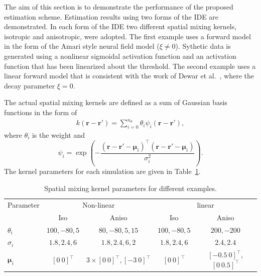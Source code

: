 \documentclass[10pt,twocolumn,twoside]{IEEEtran}
\begin{document}
The aim of this section is to demonstrate the performance of the proposed estimation scheme. Estimation results using two forms of the IDE are demonstrated. In each form of the IDE two different spatial mixing kernels, isotropic and anisotropic, were adopted. The first example uses a forward model in the form of the Amari style neural field model \cite{Amari1977} ($\xi\neq 0$). Sythetic data is generated using a nonlinear sigmoidal activation function and an activation function that has been linearized about the threshold. The second example uses a linear forward model that is consistent with the work of Dewar et al.~\cite{Dewar2007}, where the decay parameter $\xi=0$.

The actual spatial mixing kernels are defined as a sum of Gaussian basis functions in the form of
\begin{align}\label{eq:sumofGaussians}
 k\left(\mathbf{r}-\mathbf{r}'\right)=\sum_{i=0}^{n_{\theta}}\theta_i\psi_i\left(\mathbf{r}-\mathbf{r}'\right), 
 \end{align}
where $\theta_i$ is the weight and
\begin{equation}\label{eq:Kernelbasis}
	\psi_i=\exp{\left(-\frac{(\mathbf{r}-\mathbf{r}'-\boldsymbol\mu_i)^\top(\mathbf{r}-\mathbf{r}'-\boldsymbol\mu_i)}{\sigma_i^2}\right)}.
\end{equation}
The kernel parameters for each simulation are given in Table~\ref{table:KernelParameters}.
\begin{table}[htbp]
\begin{center}
{\tiny\begin{tabular}{lcccc} 
\hline\hline
\multicolumn{1}{c}{Parameter} & \multicolumn{ 2}{c}{Non-linear} & \multicolumn{ 2}{c}{linear}   \\  \cline{ 1- 5}   
\multicolumn{ 1}{c}{} & Iso & Aniso & Iso & Aniso \vspace{1 mm}\\ 
$\theta_i$ & $100, -80, 5$ & $80, -80, 5, 15$ &$100, -80, 5$&$200, -200$  \\ 
$\sigma_i$ & $1.8, 2.4, 6$ &$1.8, 2.4, 6, 2$ & $1.8, 2.4, 6$ & $2.4, 2.4$ \\ 
$\boldsymbol{\mu}_i$&$[0~0]^{\top}$& $3\times[0~0]^{\top}, [-3~0]^{\top}$ &$[0~0]^{\top}$  &$[-0.5~0]^{\top}$, $[0~0.5]^{\top}$  \vspace{2 mm}\\ \hline \hline
\end{tabular}}
\end{center}
\caption{Spatial mixing kernel parameters for different examples.}
\label{table:KernelParameters}
\end{table}
\end{document}
